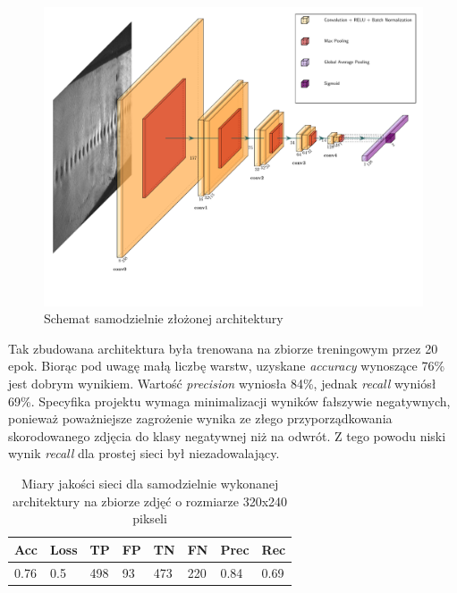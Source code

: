 \documentclass[polish,12pt]{aghthesis}
\begin{document}
\begin{figure}[h!]
    \centering
    \label{fig:simple-architecture-schema}    \includegraphics[width=16cm]{images/SimpleArchSchema.pdf}
    \caption{Schemat samodzielnie złożonej architektury}
\end{figure}

Tak zbudowana architektura była trenowana na zbiorze treningowym przez 20 epok. Biorąc pod uwagę małą liczbę warstw, uzyskane \textit{accuracy} wynoszące 76\% jest dobrym wynikiem. Wartość \textit{precision} wyniosła 84\%, jednak \textit{recall} wyniósł 69\%. Specyfika projektu wymaga minimalizacji wyników fałszywie negatywnych, ponieważ poważniejsze zagrożenie wynika ze złego przyporządkowania skorodowanego zdjęcia do klasy negatywnej niż na odwrót. Z tego powodu niski wynik \textit{recall} dla prostej sieci był niezadowalający. 


\begin{table}[h!]
\centering
 \begin{tabular}{|m{1.2cm}|m{1.2cm}|m{1.2cm}|m{1.2cm}|m{1.2cm}|m{1.2cm}|m{1.2cm}|m{1.2cm}|}
 \hline
 Acc & Loss & TP & FP & TN & FN & Prec & Rec\\
 \hline
 0.76 & 0.5 & 498 & 93 & 473 & 220 & 0.84 & 0.69\\
 \hline
 \end{tabular}
 \caption{Miary jakości sieci dla samodzielnie wykonanej architektury na zbiorze zdjęć o rozmiarze 320x240 pikseli}
 \label{table:8}
\end{table}
\end{document}
